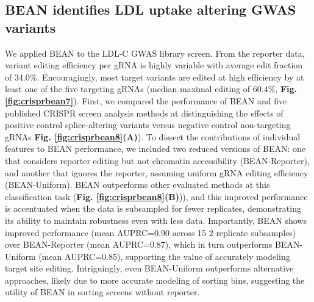 \documentclass[a4paper, titlepage, openright]{book}
\begin{document}
\subsection{BEAN identifies LDL uptake altering GWAS variants}
We applied BEAN to the LDL-C GWAS library screen. From the reporter data, variant editing efficiency per gRNA is highly variable with average edit fraction of 34.0\%. Encouragingly, most target variants are edited at high efficiency by at least one of the five targeting gRNAs (median maximal editing of 60.4\%, \textbf{Fig. \ref{fig:crisprbean7}}). 
First, we compared the performance of BEAN and five published CRISPR screen analysis methods at distinguishing the effects of positive control splice-altering variants versus negative control non-targeting gRNAs \citep{huang2021identification, li2014mageck, li2015quality, jeong2019beta, daley2018crisphiermix}  \textbf{Fig. \ref{fig:crisprbean8}(A)}). To dissect the contributions of individual features to BEAN performance, we included two reduced versions of BEAN: one that considers reporter editing but not chromatin accessibility (BEAN-Reporter), and another that ignores the reporter, assuming uniform gRNA editing efficiency (BEAN-Uniform). BEAN outperforms other evaluated methods at this classification task (\textbf{Fig. \ref{fig:crisprbean8}(B)})), and this improved performance is accentuated when the data is subsampled for fewer replicates, demonstrating its ability to maintain robustness even with less data. Importantly, BEAN shows improved performance (mean AUPRC=0.90 across 15 2-replicate subsamples) over BEAN-Reporter (mean AUPRC=0.87), which in turn outperforms BEAN-Uniform (mean AUPRC=0.85), supporting the value of accurately modeling target site editing. Intriguingly, even BEAN-Uniform outperforms alternative approaches, likely due to more accurate modeling of sorting bins, suggesting the utility of BEAN in sorting screens without reporter.
\end{document}

